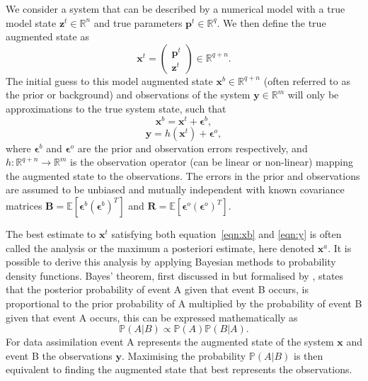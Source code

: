 \documentclass[12pt]{article}
\begin{document}
We consider a system that can be described by a numerical model with a true model state \(\textbf{z}^{t} \in \mathbb{R}^{n}\) and true parameters \(\textbf{p}^{t} \in \mathbb{R}^{q}\). We then define the true augmented state as
\begin{equation}
\textbf{x}^{t} =
\begin{pmatrix}
\textbf{p}^{t} \\
\textbf{z}^{t}
\end{pmatrix}
\in \mathbb{R}^{q+n}.
\end{equation}
The initial guess to this model augmented state \(\textbf{x}^{b} \in \mathbb{R}^{q+n}\) (often referred to as the prior or background) and observations of the system \(\textbf{y} \in \mathbb{R}^{m}\) will only be approximations to the true system state, such that
\begin{equation}
\textbf{x}^{b} = \textbf{x}^{t} + \bm{\epsilon}^{b}, \label{eqn:xb}
\end{equation} 
\begin{equation}
\textbf{y} = h(\textbf{x}^{t}) + \bm{\epsilon}^{o}, \label{eqn:y}
\end{equation} 
where \( \bm{\epsilon}^{b}\) and \( \bm{\epsilon}^{o}\) are the prior and observation errors respectively, and \(h: \mathbb{R}^{q+n}\rightarrow \mathbb{R}^{m}\) is the observation operator (can be linear or non-linear) mapping the augmented state to the observations. The errors in the prior and observations are assumed to be unbiased and mutually independent with known covariance matrices \(\textbf{B} = \mathbb{E}[\bm{\epsilon}^{b}(\bm{\epsilon}^{b})^{T}]\) and \(\textbf{R} = \mathbb{E}[\bm{\epsilon}^{o}(\bm{\epsilon}^{o})^{T}]\).

The best estimate to \(\textbf{x}^{t}\) satisfying both equation~\eqref{eqn:xb} and \eqref{eqn:y} is often called the analysis or the maximum a posteriori estimate, here denoted \(\textbf{x}^{a}\). It is possible to derive this analysis by applying Bayesian methods to probability density functions. Bayes' theorem, first discussed in \citet{bayes1763} but formalised by \citet{laplace1781memoire}, states that the posterior probability of event A given that event B occurs, is proportional to the prior probability of A multiplied by the probability of event B given that event A occurs, this can be expressed mathematically as
\begin{equation}
\mathbb{P}(A|B) \propto \mathbb{P}(A)\mathbb{P}(B|A). \label{eqn:bayes}
\end{equation}
For data assimilation event A represents the augmented state of the system \(\textbf{x}\) and event B the observations \(\textbf{y}\). Maximising the probability \(\mathbb{P}(A|B)\) is then equivalent to finding the augmented state that best represents the observations. 
\end{document}
